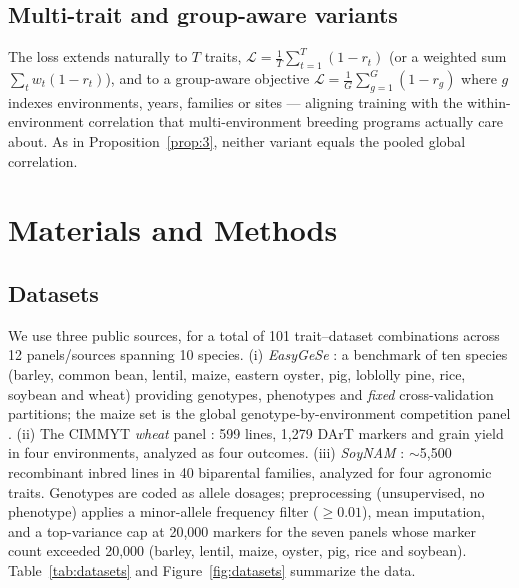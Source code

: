 \documentclass[9pt,twocolumn,twoside,lineno]{gsag3jnl}
\theoremstyle{plain}
\theoremstyle{remark}
\begin{document}
\subsection{Multi-trait and group-aware variants}\label{sec:groupaware}
The loss extends naturally to $T$ traits, $\mathcal{L}=\tfrac1T\sum_{t=1}^T
(1-r_t)$ (or a weighted sum $\sum_t w_t(1-r_t)$), and to a group-aware objective
$\mathcal{L}=\tfrac1G\sum_{g=1}^G (1-r_g)$ where $g$ indexes environments, years,
families or sites --- aligning training with the within-environment correlation
that multi-environment breeding programs actually care about. As in
Proposition~\ref{prop:3}, neither variant equals the pooled global correlation.

\section{Materials and Methods}\label{sec:methods}

\subsection{Datasets}
We use three public sources, for a total of 101
trait--dataset combinations across 12 panels/sources spanning 10 species. (i) \emph{EasyGeSe}
\citep{quesada2025easygese}: a benchmark of ten species (barley, common bean,
lentil, maize, eastern oyster, pig, loblolly pine, rice, soybean and wheat)
providing genotypes, phenotypes and \emph{fixed} cross-validation partitions; the
maize set is the global genotype-by-environment competition panel
\citep{washburn2025maize}. (ii) The CIMMYT \emph{wheat} panel
\citep{crossa2010}: 599 lines, 1{,}279 DArT markers and grain yield in four
environments, analyzed as four outcomes. (iii) \emph{SoyNAM}
\citep{xavier2016soynam}: $\sim$5{,}500 recombinant inbred lines in 40 biparental
families, analyzed for four agronomic traits. Genotypes are coded as allele
dosages; preprocessing (unsupervised, no phenotype) applies a minor-allele
frequency filter ($\geq 0.01$), mean imputation, and a top-variance cap at
20{,}000 markers for the seven panels whose marker count exceeded 20{,}000
(barley, lentil, maize, oyster, pig, rice and soybean).
Table~\ref{tab:datasets} and Figure~\ref{fig:datasets} summarize the data.
\end{document}
